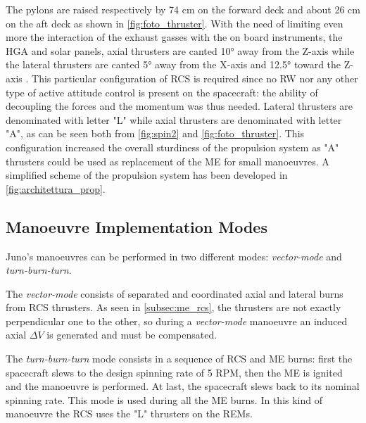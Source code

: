 

The pylons are raised respectively by 74 cm on the forward deck and about 26 cm on the aft deck as shown in \autoref{fig:foto_thruster}.
 With the need of limiting even more the interaction of the exhaust gasses with the on board instruments, the HGA and solar panels, axial thrusters are canted 10° away from the Z-axis while the lateral thrusters are canted 5° away from the X-axis and 12.5° toward the Z-axis \cite{juno_inner}. This particular configuration of RCS is required since no RW nor any other type of active attitude control is present on the spacecraft: the ability of decoupling the forces and the momentum was thus needed.
Lateral thrusters are denominated with letter "L" while axial thrusters are denominated with letter "A", as can be seen both from \autoref{fig:spin2} and \autoref{fig:foto_thruster}. This configuration increased the overall sturdiness of the propulsion system as "A" thrusters could be used as replacement of the ME for small manoeuvres. A simplified scheme of the propulsion system has been developed in \autoref{fig:architettura_prop}.

\subsection{Manoeuvre Implementation Modes}
\label{subsec:manoeuvre_implemementation_modes}

Juno's manoeuvres can be performed in two different modes: \textit{vector-mode} and \textit{turn-burn-turn}.

The \textit{vector-mode} consists of separated and coordinated axial and lateral burns from RCS thrusters. As seen in \autoref{subsec:me_rcs}, the thrusters are not exactly perpendicular one to the other, so during a \textit{vector-mode} manoeuvre an induced axial $\Delta V$ is generated and must be compensated.

The \textit{turn-burn-turn} mode consists in a sequence of RCS and ME burns: first the spacecraft slews to the design spinning rate of 5 RPM, then the ME is ignited and the manoeuvre is performed. At last, the spacecraft slews back to its nominal spinning rate. This mode is used during all the ME burns. In this kind of manoeuvre the RCS uses the "L" thrusters on the REMs. 

\pagebreak
